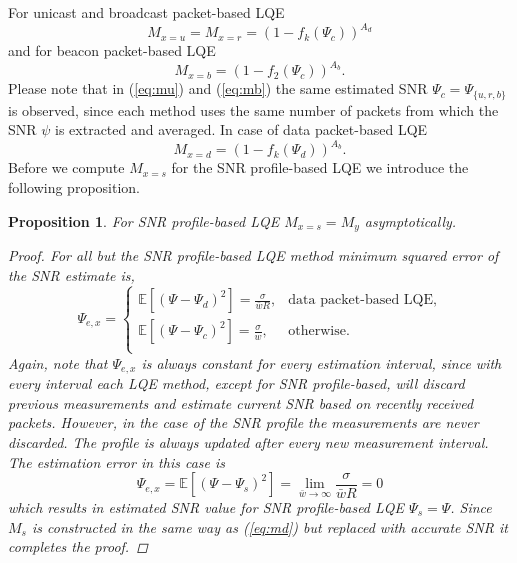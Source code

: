 \documentclass[11pt,draftclsnofoot,journal,onecolumn]{IEEEtran}
\newtheorem{proposition}{Proposition}
\begin{document}
For unicast and broadcast packet-based LQE
\begin{equation}
M_{x=u}=M_{x=r}=\left(1-f_k(\Psi_c)\right)^{A_d}
\label{eq:mu}
\end{equation}
and for beacon packet-based LQE
\begin{equation}
M_{x=b}=\left(1-f_{2}(\Psi_c)\right)^{A_b}.
\label{eq:mb}
\end{equation}
Please note that in (\ref{eq:mu}) and (\ref{eq:mb}) the same estimated SNR $\Psi_c=\Psi_{\{u,r,b\}}$ is observed, since each method uses the same number of packets from which the SNR $\psi$ is extracted and averaged. In case of data packet-based LQE
\begin{equation}
M_{x=d}=\left(1-f_k(\Psi_d)\right)^{A_b}.
\label{eq:md}
\end{equation}
Before we compute $M_{x=s}$ for the SNR profile-based LQE we introduce the following proposition.
\begin{proposition}
For SNR profile-based LQE $M_{x=s}=M_y$ asymptotically.
\begin{proof}
For all but the SNR profile-based LQE method minimum squared error of the SNR estimate is,
\begin{equation}
\Psi_{e,x}=
\begin{cases}
\mathbb{E}[(\Psi-\Psi_d)^2]=\frac{\sigma}{\bar{w}R}, & \text{data packet-based LQE},\\
\mathbb{E}[(\Psi-\Psi_c)^2]=\frac{\sigma}{w}, & \text{otherwise}.\\
\end{cases}
\end{equation}
Again, note that $\Psi_{e,x}$ is always constant for every estimation interval, since with every interval each LQE method, except for SNR profile-based, will discard previous measurements and estimate current SNR based on recently received packets. However, in the case of the SNR profile the measurements are never discarded. The profile is always updated after every new measurement interval. The estimation error in this case is
\begin{equation}
\Psi_{e,x}=\mathbb{E}[(\Psi-\Psi_s)^2]=\lim_{\bar{w}\rightarrow\infty}\frac{\sigma}{\bar{w}R}=0
\end{equation}
which results in estimated SNR value for SNR profile-based LQE $\Psi_s=\Psi$. Since $M_s$ is constructed in the same way as (\ref{eq:md}) but replaced with accurate SNR it completes the proof. \end{proof} \label{lem:1} \end{proposition}
\end{document}
